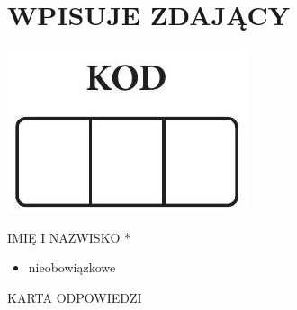 \documentclass[10pt]{article}
\begin{document}
\section*{WPISUJE ZDAJĄCY}
\begin{center}
\includegraphics[max width=\textwidth]{2024_11_21_72158d4a4efa7dd894bcg-25}
\end{center}

IMIĘ I NAZWISKO *

\begin{itemize}
  \item nieobowiązkowe
\end{itemize}

KARTA ODPOWIEDZI
\end{document}
